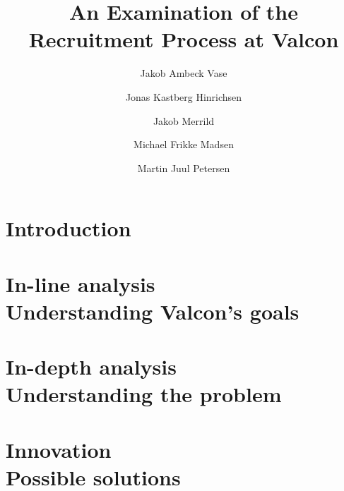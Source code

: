 \documentclass[hidelinks, a4paper]{report}
\begin{document}
\title{An Examination of the Recruitment Process at Valcon}
\author{Jakob Ambeck Vase \and Jonas Kastberg Hinrichsen \and Jakob Merrild \and Michael Frikke Madsen \and Martin Juul Petersen}
\listoftodos[Todos]

\maketitle
\tableofcontents
\chapter{Introduction}

\chapter{In-line analysis \\ Understanding Valcon's goals}

\chapter{In-depth analysis \\ Understanding the problem}

\chapter{Innovation \\ Possible solutions}


\appendix

\end{document}
